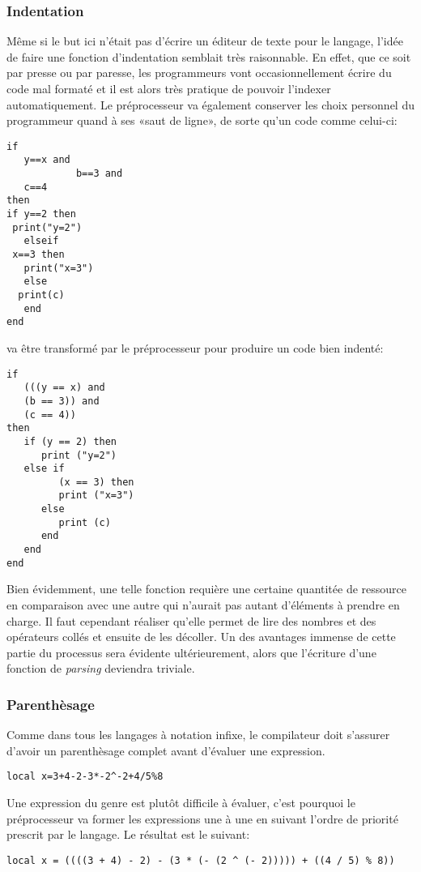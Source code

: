 \documentclass{article}
\begin{document}
\subsubsection{Indentation}
Même si le but ici n'était pas d'écrire un éditeur de texte pour le langage, l'idée de faire une fonction d'indentation semblait très raisonnable. En effet, que ce soit par presse ou par paresse, les programmeurs vont occasionnellement écrire du code mal formaté et il est alors très pratique de pouvoir l'indexer automatiquement. Le préprocesseur va également conserver les choix personnel du programmeur quand à ses «saut de ligne», de sorte qu'un code comme celui-ci:
\begin{lstlisting}[caption={Code mal formaté},label=DescriptiveLabel]
if
   y==x and
            b==3 and
   c==4
then
if y==2 then
 print("y=2")
   elseif
 x==3 then
   print("x=3")
   else
  print(c)
   end
end
\end{lstlisting}
va être transformé par le préprocesseur pour produire un code bien indenté:
\begin{lstlisting}[belowcaptionskip = -1\baselineskip]
if 
   (((y == x) and 
   (b == 3)) and 
   (c == 4)) 
then 
   if (y == 2) then 
      print ("y=2") 
   else if 
         (x == 3) then 
         print ("x=3") 
      else 
         print (c) 
      end 
   end 
end 
\end{lstlisting}

Bien évidemment, une telle fonction requière une certaine quantitée de ressource en comparaison avec une autre qui n'aurait pas autant d'éléments à prendre en charge. Il faut cependant réaliser qu'elle permet de lire des nombres et des opérateurs collés et ensuite de les décoller. Un des avantages immense de cette partie du processus sera évidente ultérieurement, alors que l'écriture d'une fonction de \textit{parsing} deviendra triviale.

\newpage
\subsubsection{Parenthèsage}
Comme dans tous les langages à notation infixe, le compilateur doit s'assurer d'avoir un parenthèsage complet avant d'évaluer une expression.
\begin{lstlisting}[caption={Parenthèsage incomplet},label=DescriptiveLabel]
  local x=3+4-2-3*-2^-2+4/5%8
\end{lstlisting}

Une expression du genre est plutôt difficile à évaluer, c'est pourquoi le préprocesseur va former les expressions une à une en suivant l'ordre de priorité prescrit par le langage. Le résultat est le suivant:
\begin{lstlisting}[belowcaptionskip = -1\baselineskip]
local x = ((((3 + 4) - 2) - (3 * (- (2 ^ (- 2))))) + ((4 / 5) % 8))
\end{lstlisting}
\end{document}
